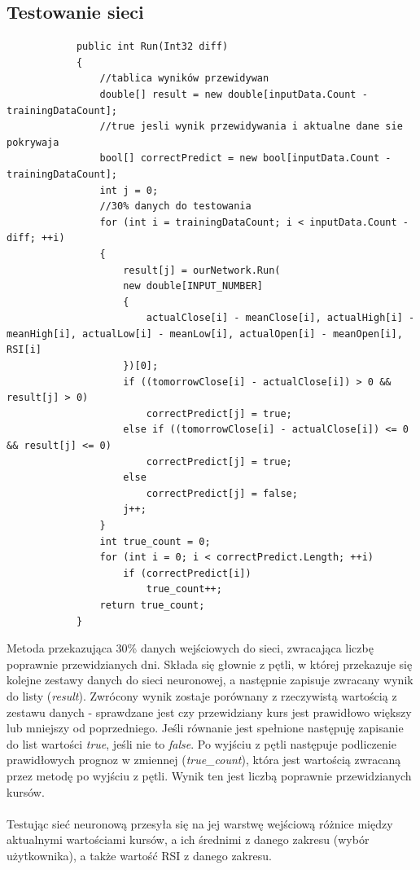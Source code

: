 \documentclass[a4paper]{article}
\begin{document}
	\subsection{Testowanie sieci}
		\begin{lstlisting}
			public int Run(Int32 diff)
			{
				//tablica wyników przewidywan
				double[] result = new double[inputData.Count - trainingDataCount];
				//true jesli wynik przewidywania i aktualne dane sie pokrywaja
				bool[] correctPredict = new bool[inputData.Count - trainingDataCount];
				int j = 0;
				//30% danych do testowania
				for (int i = trainingDataCount; i < inputData.Count - diff; ++i)
				{
					result[j] = ourNetwork.Run(
					new double[INPUT_NUMBER]
					{
						actualClose[i] - meanClose[i], actualHigh[i] - meanHigh[i], actualLow[i] - meanLow[i], actualOpen[i] - meanOpen[i], RSI[i]
					})[0];
					if ((tomorrowClose[i] - actualClose[i]) > 0 && result[j] > 0)
						correctPredict[j] = true;
					else if ((tomorrowClose[i] - actualClose[i]) <= 0 && result[j] <= 0)
						correctPredict[j] = true;
					else
						correctPredict[j] = false;
					j++;
				}
				int true_count = 0;
				for (int i = 0; i < correctPredict.Length; ++i)
					if (correctPredict[i])
						true_count++;
				return true_count;
			}
		\end{lstlisting}\indent\indent
		Metoda przekazująca 30\% danych wejściowych do sieci, zwracająca liczbę poprawnie przewidzianych dni. Składa się głownie z pętli, w której przekazuje się kolejne zestawy danych do sieci neuronowej, a następnie zapisuje zwracany wynik do listy (\textit{result}). Zwrócony wynik zostaje porównany z rzeczywistą wartością z zestawu danych - sprawdzane jest czy przewidziany kurs jest prawidłowo większy lub mniejszy od poprzedniego. Jeśli równanie jest spełnione następuję zapisanie do list wartości \textit{true}, jeśli nie to \textit{false}. Po wyjściu z pętli następuje podliczenie prawidłowych prognoz  w zmiennej (\textit{true\_count}), która jest wartością zwracaną przez metodę po wyjściu z pętli. Wynik ten jest liczbą poprawnie przewidzianych kursów.\\\\\indent
		Testując sieć neuronową przesyła się na jej warstwę wejściową różnice między aktualnymi wartościami kursów, a ich średnimi z danego zakresu (wybór użytkownika), a także wartość RSI z danego zakresu.
\end{document}
